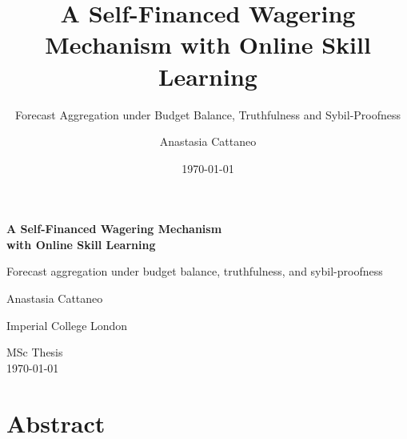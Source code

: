 \documentclass[
  11pt,
  a4paper,
  oneside]{report}
\title{A Self-Financed Wagering Mechanism with Online Skill Learning}
\subtitle{Forecast Aggregation under Budget Balance, Truthfulness and
Sybil-Proofness}
\author{Anastasia Cattaneo}
\date{\today}
\renewcommand{\maketitle}{}
\begin{document}
\maketitle

\begin{titlepage}
\begin{center}
\vspace*{4em}
{\Huge\bfseries A Self-Financed Wagering Mechanism\\[0.5em] with Online Skill Learning\par}
\vspace{1.5em}
{\Large Forecast aggregation under budget balance, truthfulness, and sybil-proofness\par}
\vspace{4em}
{\Large Anastasia Cattaneo\par}
\vspace{1em}
{\large Imperial College London\par}
\vspace{4em}
{\large MSc Thesis \\ \today\par}
\vfill
\end{center}
\end{titlepage}


\chapter*{Abstract}
\end{document}
